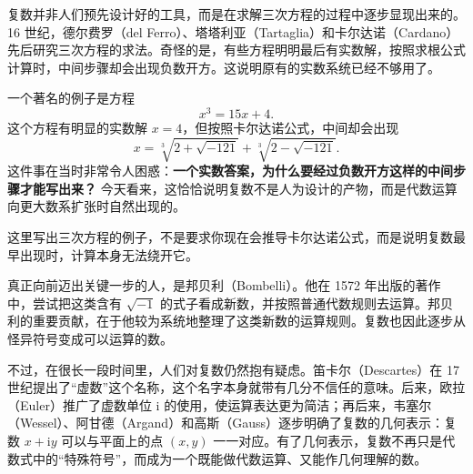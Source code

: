 复数并非人们预先设计好的工具，而是在求解三次方程的过程中逐步显现出来的。16 世纪，德尔费罗（del Ferro）、塔塔利亚（Tartaglia）和卡尔达诺（Cardano）先后研究三次方程的求法。奇怪的是，有些方程明明最后有实数解，按照求根公式计算时，中间步骤却会出现负数开方。这说明原有的实数系统已经不够用了。

一个著名的例子是方程
\[
x^3=15x+4.
\]
这个方程有明显的实数解 $x=4$，但按照卡尔达诺公式，中间却会出现
\[
x=\sqrt[3]{2+\sqrt{-121}}+\sqrt[3]{2-\sqrt{-121}}.
\]
这件事在当时非常令人困惑：\textbf{一个实数答案，为什么要经过负数开方这样的中间步骤才能写出来？} 今天看来，这恰恰说明复数不是人为设计的产物，而是代数运算向更大数系扩张时自然出现的。

\begin{tishi}[卡尔达诺公式的学习定位]
这里写出三次方程的例子，不是要求你现在会推导卡尔达诺公式，而是说明复数最早出现时，计算本身无法绕开它。
\end{tishi}

真正向前迈出关键一步的人，是邦贝利（Bombelli）。他在 1572 年出版的著作中，尝试把这类含有 $\sqrt{-1}$ 的式子看成新数，并按照普通代数规则去运算。邦贝利的重要贡献，在于他较为系统地整理了这类新数的运算规则。复数也因此逐步从怪异符号变成可以运算的数。

不过，在很长一段时间里，人们对复数仍然抱有疑虑。笛卡尔（Descartes）在 17 世纪提出了``虚数''这个名称，这个名字本身就带有几分不信任的意味。后来，欧拉（Euler）推广了虚数单位 $\mathrm{i}$ 的使用，使运算表达更为简洁；再后来，韦塞尔（Wessel）、阿甘德（Argand）和高斯（Gauss）逐步明确了复数的几何表示：复数 $x+\mathrm{i}y$ 可以与平面上的点 $(x,y)$ 一一对应。有了几何表示，复数不再只是代数式中的``特殊符号''，而成为一个既能做代数运算、又能作几何理解的数。


